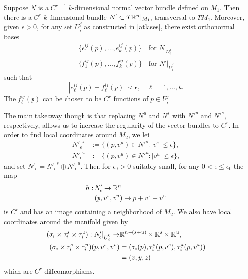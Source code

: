 \begin{prop}
	Suppose \(N\) is a \(C^{r-1}\)  \(k\)-dimensional normal vector bundle defined on \(M_1\). Then there is a \(C^r\) \(k\)-dimensional bundle \(N'\subset T\mathbb{R}^n |_{M_1}\), transversal to \(TM_1\). Moreover, given \(\epsilon > 0\), for any set \(U^j_i\) as constructed in \cref{atlases}, there exist orthonormal bases 
	\begin{align}
		\{e^{ij}_1(p), \ldots, e^{ij}_k(p)\} \quad \text{for } N|_{U^j_i} \\
		\{f^{ij}_1(p), \ldots, f^{ij}_k(p)\} \quad \text{for } N'|_{U^j_i} 
	\end{align}
	such that
	\begin{equation}
		|e^{ij}_\ell(p) - f^{ij}_\ell(p) | < \epsilon, \quad \ell = 1,\ldots, k.
	\end{equation}
	The \(f^{ij}_\ell(p)\) can be chosen to be \(C^r\) functions of \(p \in U^j_i\)
\end{prop}
The main takeaway though is that replacing \(N^u\) and \(N^s\) with \({N'}^u\) and \({N'}^s\), respectively, allows us to increase the regularity of the vector bundles to \(C^r\). In order to find local coordinates around \(M_2\), we let 
\begin{align}
	{N'_\epsilon}^s &:= \{(p, v^u) \in {N'}^s: |v^s| \leq \epsilon\}, \\
	{N'_\epsilon}^ u&:= \{(p, v^u) \in {N'}^u: |v^u| \leq \epsilon\},
\end{align}
and set \(N'_\epsilon = {N'_\epsilon}^s \oplus {N'_\epsilon}^u\). Then for \(\epsilon_0>0\) suitably small, for any \(0< \epsilon \leq \epsilon_0\) the map
\begin{equation}
\begin{aligned}
	h:\, &N'_\epsilon  \to \mathbb{R}^n \\
	&(p, v^s, v^u) \mapsto p + v^s + v^u
\end{aligned}
\end{equation}
is \(C^r\) and has an image containing a neighborhood of \(M_2\). We also have local coordinates around the manifold given by
\begin{equation}
\begin{aligned}
	(\sigma_i \times \tau_i^s \times \tau_i^u) : N'_\epsilon |_{\overline U_i^6}  \to &\mathbb{R}^{n-(s+u)} \times \mathbb{R}^s \times \mathbb{R}^u, \\
	(\sigma_i \times \tau_i^s \times \tau_i^u) (p, v^s, v^u) &= (\sigma_i(p), \tau_i^s(p, v^s), \tau_i^u(p, v^u)) \\
	&= (x,y,z)
\end{aligned}
\end{equation}
which are \(C^r\) diffeomorphisms.

